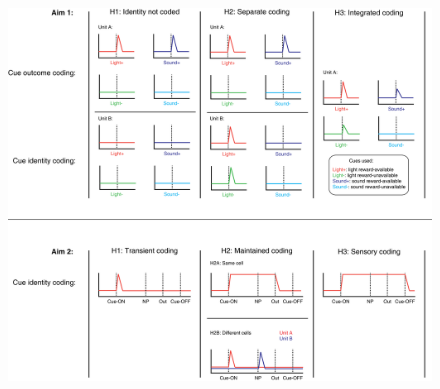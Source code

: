 \documentclass[11pt]{article}
\providecommand{\DIFaddbeginFL}{} %
\providecommand{\DIFdelbeginFL}{} %
\providecommand{\DIFdelendFL}{} %
\newcommand{\DIFscaledelfig}{0.5}
\newlength{\DIFdelgraphicswidth} %
\newlength{\DIFdelgraphicsheight} %
\newcommand{\DIFaddincludegraphics}[2][]{{\color{blue}\fbox{\DIFOincludegraphics[#1]{#2}}}} %
\newcommand{\DIFdelincludegraphics}[2][]{%
\sbox{\DIFdelgraphicsbox}{\DIFOincludegraphics[#1]{#2}}%
\settoboxwidth{\DIFdelgraphicswidth}{\DIFdelgraphicsbox} %
\settoboxtotalheight{\DIFdelgraphicsheight}{\DIFdelgraphicsbox} %
\scalebox{\DIFscaledelfig}{%
\parbox[b]{\DIFdelgraphicswidth}{\usebox{\DIFdelgraphicsbox}\\[-\baselineskip] \rule{\DIFdelgraphicswidth}{0em}}\llap{\resizebox{\DIFdelgraphicswidth}{\DIFdelgraphicsheight}{%
\setlength{\unitlength}{\DIFdelgraphicswidth}%
\begin{picture}(1,1)%
\thicklines\linethickness{2pt} %
{\color[rgb]{1,0,0}\put(0,0){\framebox(1,1){}}}%
{\color[rgb]{1,0,0}\put(0,0){\line( 1,1){1}}}%
{\color[rgb]{1,0,0}\put(0,1){\line(1,-1){1}}}%
\end{picture}%
}\hspace*{3pt}}} %
} %
\DeclareRobustCommand{\DIFaddbeginFL}{\DIFOaddbeginFL \let\includegraphics\DIFaddincludegraphics} %
\DeclareRobustCommand{\DIFdelbeginFL}{\DIFOdelbeginFL \let\includegraphics\DIFdelincludegraphics} %
\DeclareRobustCommand{\DIFdelendFL}{\DIFOaddendFL \let\includegraphics\DIFOincludegraphics} %
\begin{document}
\begin{figure}
[h]
\centering
\DIFdelbeginFL %
\DIFdelendFL \DIFaddbeginFL \includegraphics[height=0.5\textheight]{Fig 1 - Schematic neural.png}

\end{figure}
\end{document}
